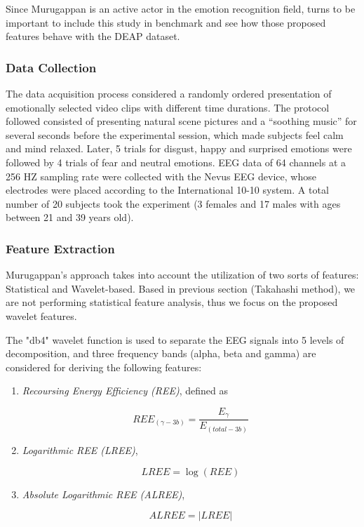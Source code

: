 \documentclass{sig-alternate}
\begin{document}
Since Murugappan is an active actor in the emotion recognition field, turns to be important to include this study in benchmark and see how those proposed features behave with the DEAP dataset.

\subsubsection{Data Collection}

The data acquisition process considered a randomly ordered presentation of emotionally selected video clips with different time durations. The protocol followed consisted of presenting natural scene pictures and a ``soothing music'' for several seconds before the experimental session, which made subjects feel calm and mind relaxed. Later, 5 trials for disgust, happy and surprised emotions were followed by 4 trials of fear and neutral emotions. EEG data of 64 channels at a 256 HZ sampling rate were collected with the Nevus EEG device, whose electrodes were placed according to the International 10-10 system. A total number of 20 subjects took the experiment (3 females  and 17 males with ages between 21 and 39 years old).

\subsubsection{Feature Extraction}

Murugappan's approach takes into account the utilization of two sorts of features: Statistical and Wavelet-based. Based in previous section (Takahashi method), we are not performing statistical feature analysis, thus we focus on the proposed wavelet features.

The "db4" wavelet function is used to separate the EEG signals into 5 levels of decomposition, and three frequency bands (alpha, beta and gamma) are considered for deriving the following features:

\begin{enumerate}
\item \textit{Recoursing Energy Efficiency (REE)}, defined as

\begin{equation}
REE_(\gamma-3b) = \frac{E_\gamma}{E_(total-3b)}
\end{equation}
\label{ec:ree}

\item \textit{Logarithmic REE (LREE)}, 

\begin{equation}
LREE = \log(REE)
\end{equation}
\label{ec:lree}

\item \textit{Absolute Logarithmic REE (ALREE)}, 

\begin{equation}
ALREE = \mathopen|LREE\mathclose|
\end{equation}
\label{ec:alree}


\end{enumerate}
\end{document}
